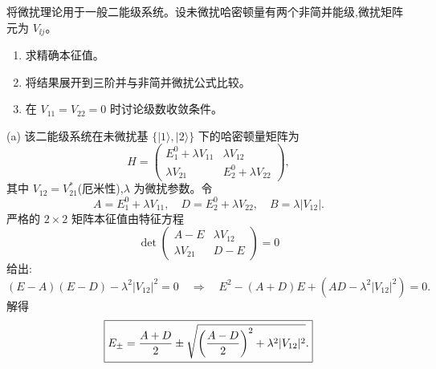 \begin{question}
将微扰理论用于一般二能级系统。设未微扰哈密顿量有两个非简并能级,微扰矩阵元为 $V_{\ii j}$。
\begin{enumerate}
\item 求精确本征值。
\item 将结果展开到三阶并与非简并微扰公式比较。
\item 在 $V_{11}=V_{22}=0$ 时讨论级数收敛条件。
\end{enumerate}
\begin{solution}
(a) 该二能级系统在未微扰基 $\{|1\rangle,|2\rangle\}$ 下的哈密顿量矩阵为
\[
H=\begin{pmatrix}
E_1^0+\lambda V_{11} & \lambda V_{12}\\[2pt]
\lambda V_{21} & E_2^0+\lambda V_{22}
\end{pmatrix},
\]
其中 $V_{12}=V_{21}^*$(厄米性),$\lambda$ 为微扰参数。令
\[
A=E_1^0+\lambda V_{11},\quad D=E_2^0+\lambda V_{22},\quad
B=\lambda|V_{12}|.
\]
严格的 $2\times2$ 矩阵本征值由特征方程
\[
\det\begin{pmatrix}A-E & \lambda V_{12}\\ \lambda V_{21} & D-E\end{pmatrix}=0
\]
给出:
\[
(E-A)(E-D)-\lambda^2|V_{12}|^2=0
\quad\Longrightarrow\quad
E^2-(A+D)E+(AD-\lambda^2|V_{12}|^2)=0.
\]
解得
\[
\boxed{E_\pm={A+D\over2}\pm\sqrt{\left({A-D\over2}\right)^2+\lambda^2|V_{12}|^2}.}
\]


\end{solution}
\end{question}

